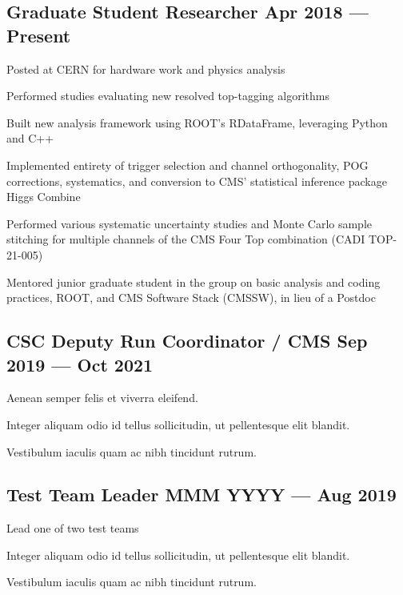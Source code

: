 \documentclass[letter,10pt]{article}
\begin{document}
\subsection{{Graduate Student Researcher \hfill Apr 2018 --- Present}}
\begin{zitemize}
\item Posted at CERN for hardware work and physics analysis
\item Performed studies evaluating new resolved top-tagging algorithms
\item Built new analysis framework using ROOT's RDataFrame, leveraging Python and C++
\item Implemented entirety of trigger selection and channel orthogonality, POG corrections, systematics, and conversion to CMS' statistical inference package Higgs Combine
\item Performed various systematic uncertainty studies and Monte Carlo sample stitching for multiple channels of the CMS Four Top combination (CADI TOP-21-005)
\item Mentored junior graduate student in the group on basic analysis and coding practices, ROOT, and CMS Software Stack (CMSSW), in lieu of a Postdoc
\end{zitemize}

\subsection{{CSC Deputy Run Coordinator / CMS \hfill Sep 2019 --- Oct 2021}}
\begin{zitemize}
\item Aenean semper felis et viverra eleifend.
\item Integer aliquam odio id tellus sollicitudin, ut pellentesque elit blandit.
\item Vestibulum iaculis quam ac nibh tincidunt rutrum.
\end{zitemize}

\subsection{{Test Team Leader \hfill MMM YYYY --- Aug 2019}}
\begin{zitemize}
\item Lead one of two test teams
\item Integer aliquam odio id tellus sollicitudin, ut pellentesque elit blandit.
\item Vestibulum iaculis quam ac nibh tincidunt rutrum.
\end{zitemize}
\end{document}
